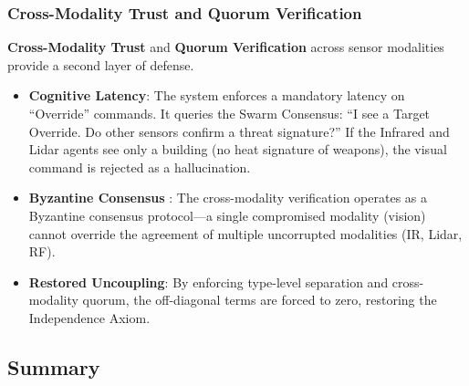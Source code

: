 \documentclass[
]{article}
\providecommand{\tightlist}{%
  \setlength{\itemsep}{0pt}\setlength{\parskip}{0pt}}
\begin{document}
\subsubsection{Cross-Modality Trust and Quorum
Verification}\label{cross-modality-trust-and-quorum-verification}

\textbf{Cross-Modality Trust} and \textbf{Quorum Verification}
\cite{friedman2026cogsec1} across sensor modalities provide a second
layer of defense.

\begin{itemize}
\tightlist
\item
  \textbf{Cognitive Latency}: The system enforces a mandatory latency on
  ``Override'' commands. It queries the Swarm Consensus: ``I see a
  Target Override. Do other sensors confirm a threat signature?'' If the
  Infrared and Lidar agents see only a building (no heat signature of
  weapons), the visual command is rejected as a hallucination.
\item
  \textbf{Byzantine Consensus} \cite{friedman2026cogsec1}: The
  cross-modality verification operates as a Byzantine consensus
  protocol---a single compromised modality (vision) cannot override the
  agreement of multiple uncorrupted modalities (IR, Lidar, RF).
\item
  \textbf{Restored Uncoupling}: By enforcing type-level separation and
  cross-modality quorum, the off-diagonal terms are forced to zero,
  restoring the Independence Axiom.
\end{itemize}

\subsection{Summary}\label{summary-3}
\end{document}
